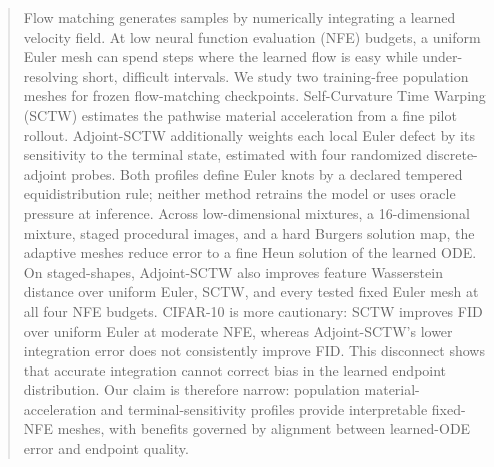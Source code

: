 \begin{abstract}
Flow matching generates samples by numerically integrating a learned velocity field. At low neural
function evaluation (NFE) budgets, a uniform Euler mesh can spend steps where the learned flow is
easy while under-resolving short, difficult intervals. We study two training-free population
meshes for frozen flow-matching checkpoints. Self-Curvature Time Warping (SCTW) estimates the
pathwise material acceleration from a fine pilot rollout. Adjoint-SCTW additionally weights each
local Euler defect by its sensitivity to the terminal state, estimated with four randomized
discrete-adjoint probes. Both profiles define Euler knots by a declared tempered
equidistribution rule; neither method retrains the model or uses oracle pressure at inference.
Across low-dimensional mixtures, a 16-dimensional mixture, staged procedural images, and a hard
Burgers solution map, the adaptive meshes reduce error to a fine Heun solution of the learned ODE.
On staged-shapes, Adjoint-SCTW also improves feature Wasserstein distance over uniform Euler,
SCTW, and every tested fixed Euler mesh at all four NFE budgets. CIFAR-10 is more cautionary:
SCTW improves FID over uniform Euler at moderate NFE, whereas Adjoint-SCTW's lower integration
error does not consistently improve FID. This disconnect shows that accurate integration cannot
correct bias in the learned endpoint distribution. Our claim is therefore narrow: population
material-acceleration and terminal-sensitivity profiles provide interpretable fixed-NFE meshes,
with benefits governed by alignment between learned-ODE error and endpoint quality.
\end{abstract}
